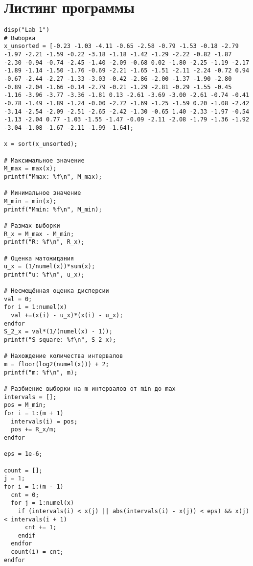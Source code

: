 \begin{figure}[H]
	\center{\texttt{[image: 1]}}
\end{figure}

\begin{figure}[H]
	\center{\texttt{[image: 2]}}
\end{figure}

\section{Листинг программы}
\begin{lstlisting}
disp("Lab 1")
# Выборка
x_unsorted = [-0.23 -1.03 -4.11 -0.65 -2.58 -0.79 -1.53 -0.18 -2.79 -1.97 -2.21 -1.59 -0.22 -3.18 -1.18 -1.42 -1.29 -2.22 -0.82 -1.87 -2.30 -0.94 -0.74 -2.45 -1.40 -2.09 -0.68 0.02 -1.80 -2.25 -1.19 -2.17 -1.89 -1.14 -1.50 -1.76 -0.69 -2.21 -1.65 -1.51 -2.11 -2.24 -0.72 0.94 -0.67 -2.44 -2.27 -1.33 -3.03 -0.42 -2.86 -2.00 -1.37 -1.90 -2.80 -0.89 -2.04 -1.66 -0.14 -2.79 -0.21 -1.29 -2.81 -0.29 -1.55 -0.45 -1.16 -3.96 -3.77 -3.36 -1.81 0.13 -2.61 -3.69 -3.00 -2.61 -0.74 -0.41 -0.78 -1.49 -1.89 -1.24 -0.00 -2.72 -1.69 -1.25 -1.59 0.20 -1.08 -2.42 -3.14 -2.54 -2.09 -2.51 -2.65 -2.42 -1.30 -0.65 1.40 -2.33 -1.97 -0.54 -1.13 -2.04 0.77 -1.03 -1.55 -1.47 -0.09 -2.11 -2.08 -1.79 -1.36 -1.92 -3.04 -1.08 -1.67 -2.11 -1.99 -1.64];

x = sort(x_unsorted);

# Максимальное значение
M_max = max(x);
printf("Mmax: %f\n", M_max);

# Минимальное значение
M_min = min(x);
printf("Mmin: %f\n", M_min);

# Размах выборки
R_x = M_max - M_min;
printf("R: %f\n", R_x);

# Оценка матожидания
u_x = (1/numel(x))*sum(x);
printf("u: %f\n", u_x);

# Несмещённая оценка дисперсии
val = 0;
for i = 1:numel(x)
  val +=(x(i) - u_x)*(x(i) - u_x);
endfor
S_2_x = val*(1/(numel(x) - 1));
printf("S square: %f\n", S_2_x);

# Нахождение количества интервалов
m = floor(log2(numel(x))) + 2;
printf("m: %f\n", m);

# Разбиение выборки на m интервалов от min до max
intervals = [];
pos = M_min;
for i = 1:(m + 1)
  intervals(i) = pos;
  pos += R_x/m;
endfor

eps = 1e-6;

count = [];
j = 1;
for i = 1:(m - 1)
  cnt = 0;
  for j = 1:numel(x)
    if (intervals(i) < x(j) || abs(intervals(i) - x(j)) < eps) && x(j) < intervals(i + 1)
      cnt += 1;
    endif
  endfor
  count(i) = cnt;
endfor


\end{lstlisting}
